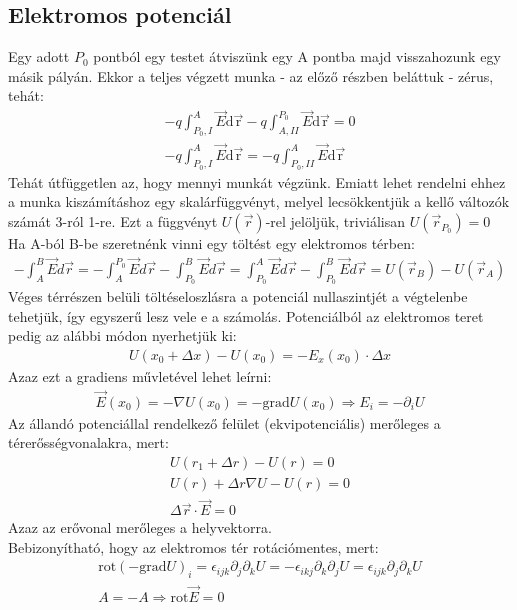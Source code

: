 \documentclass{article}
\begin{document}
\subsection{Elektromos potenciál}
Egy adott $P_0$ pontból egy testet átviszünk egy A pontba majd visszahozunk egy másik pályán. Ekkor a teljes végzett munka - az előző részben beláttuk - zérus, tehát:
\begin{gather*}
-q \int_{P_0, I}^{A} \vec{E} \mathrm{d\vec{r}} - 	q \int_{A, II}^{P_0} \vec{E} \mathrm{d\vec{r}} = 0 \\
-q \int_{P_0, I}^{A} \vec{E} \mathrm{d\vec{r}} = - 	q \int_{P_0, II}^{A} \vec{E} \mathrm{d\vec{r}}
\end{gather*}
Tehát útfüggetlen az, hogy mennyi munkát végzünk. Emiatt lehet rendelni ehhez a munka kiszámításhoz egy skalárfüggvényt, melyel lecsökkentjük a kellő változók számát 3-ról 1-re. Ezt a függvényt $U(\vec{r})$-rel jelöljük, triviálisan $U(\vec{r}_{P_0}) = 0$
Ha A-ból B-be szeretnénk vinni egy töltést egy elektromos térben: 
\begin{gather*}
-\int_A^B \vec{E} d\vec{r} = -\int_A^{P_{0}} \vec{E} d\vec{r}-\int_{P_0}^{B} \vec{E} d\vec{r} = \int_{P_0}^{A} \vec{E} d\vec{r} - \int_{P_0}^{B} \vec{E} d\vec{r} = U(\vec{r}_B)-U(\vec{r}_A)
\end{gather*}
Véges térrészen belüli töltéseloszlásra a potenciál nullaszintjét a végtelenbe tehetjük, így egyszerű lesz vele e a számolás. Potenciálból az elektromos teret pedig az alábbi módon nyerhetjük ki:
\begin{gather*}
U(x_0+\Delta x) - U(x_0) = -E_x(x_0)\cdot \Delta x
\end{gather*}
Azaz ezt a gradiens művletével lehet leírni: 
\begin{gather*}
\vec{E}(x_0) = -\nabla U(x_0) = -\mathrm{grad} U(x_0) \Rightarrow E_i = -\partial_i U
\end{gather*}
Az állandó potenciállal rendelkező felület (ekvipotenciális) merőleges a térerősségvonalakra, mert:
\begin{gather*}
U(r_1+\Delta r)-U(r) = 0\\
U(r) + \Delta r \nabla U -U(r) = 0 \\
\Delta \vec{r} \cdot \vec{E} = 0
\end{gather*}
Azaz az erővonal merőleges a helyvektorra.
\\
Bebizonyítható, hogy az elektromos tér rotációmentes, mert:
\begin{gather*}
\mathrm{rot}(-\mathrm{grad} U)_i = \epsilon_{ijk} \partial_j \partial_k U = -\epsilon_{ikj} \partial_k \partial_j U = \epsilon_{ijk} \partial_j \partial_k U \\
A=-A \Rightarrow \mathrm{rot} \vec{E}=0 
\end{gather*}
\end{document}

